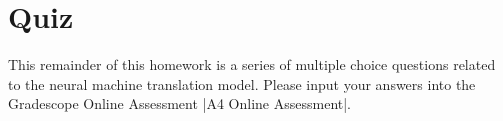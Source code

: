 \section{Quiz}

This remainder of this homework is a series of multiple choice questions related to the neural machine translation model. Please input your answers into the Gradescope Online Assessment |A4 Online Assessment|.






